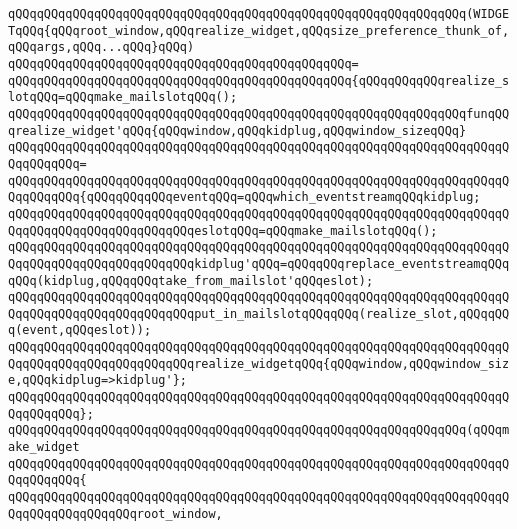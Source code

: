 \verb|qQQqqQQqqQQqqQQqqQQqqQQqqQQqqQQqqQQqqQQqqQQqqQQqqQQqqQQqqQQqqQQq(WIDGETqQQq{qQQqroot_window,qQQqrealize_widget,qQQqsize_preference_thunk_of,qQQqargs,qQQq...qQQq}qQQq)|\newline
\verb|qQQqqQQqqQQqqQQqqQQqqQQqqQQqqQQqqQQqqQQqqQQqqQQq=|\newline
\verb|qQQqqQQqqQQqqQQqqQQqqQQqqQQqqQQqqQQqqQQqqQQqqQQq{qQQqqQQqqQQqrealize_slotqQQq=qQQqmake_mailslotqQQq();|\newline
\newline
\verb|qQQqqQQqqQQqqQQqqQQqqQQqqQQqqQQqqQQqqQQqqQQqqQQqqQQqqQQqqQQqqQQqfunqQQqrealize_widget'qQQq{qQQqwindow,qQQqkidplug,qQQqwindow_sizeqQQq}|\newline
\verb|qQQqqQQqqQQqqQQqqQQqqQQqqQQqqQQqqQQqqQQqqQQqqQQqqQQqqQQqqQQqqQQqqQQqqQQqqQQqqQQq=|\newline
\verb|qQQqqQQqqQQqqQQqqQQqqQQqqQQqqQQqqQQqqQQqqQQqqQQqqQQqqQQqqQQqqQQqqQQqqQQqqQQqqQQq{qQQqqQQqqQQqeventqQQq=qQQqwhich_eventstreamqQQqkidplug;|\newline
\verb|qQQqqQQqqQQqqQQqqQQqqQQqqQQqqQQqqQQqqQQqqQQqqQQqqQQqqQQqqQQqqQQqqQQqqQQqqQQqqQQqqQQqqQQqqQQqqQQqeslotqQQq=qQQqmake_mailslotqQQq();|\newline
\newline
\verb|qQQqqQQqqQQqqQQqqQQqqQQqqQQqqQQqqQQqqQQqqQQqqQQqqQQqqQQqqQQqqQQqqQQqqQQqqQQqqQQqqQQqqQQqqQQqqQQqkidplug'qQQq=qQQqqQQqreplace_eventstreamqQQqqQQq(kidplug,qQQqqQQqtake_from_mailslot'qQQqeslot);|\newline
\newline
\verb|qQQqqQQqqQQqqQQqqQQqqQQqqQQqqQQqqQQqqQQqqQQqqQQqqQQqqQQqqQQqqQQqqQQqqQQqqQQqqQQqqQQqqQQqqQQqqQQqput_in_mailslotqQQqqQQq(realize_slot,qQQqqQQq(event,qQQqeslot));|\newline
\newline
\verb|qQQqqQQqqQQqqQQqqQQqqQQqqQQqqQQqqQQqqQQqqQQqqQQqqQQqqQQqqQQqqQQqqQQqqQQqqQQqqQQqqQQqqQQqqQQqqQQqrealize_widgetqQQq{qQQqwindow,qQQqwindow_size,qQQqkidplug=>kidplug'};|\newline
\verb|qQQqqQQqqQQqqQQqqQQqqQQqqQQqqQQqqQQqqQQqqQQqqQQqqQQqqQQqqQQqqQQqqQQqqQQqqQQqqQQq};|\newline
\newline
\verb|qQQqqQQqqQQqqQQqqQQqqQQqqQQqqQQqqQQqqQQqqQQqqQQqqQQqqQQqqQQqqQQq(qQQqmake_widget|\newline
\verb|qQQqqQQqqQQqqQQqqQQqqQQqqQQqqQQqqQQqqQQqqQQqqQQqqQQqqQQqqQQqqQQqqQQqqQQqqQQqqQQq{|\newline
\verb|qQQqqQQqqQQqqQQqqQQqqQQqqQQqqQQqqQQqqQQqqQQqqQQqqQQqqQQqqQQqqQQqqQQqqQQqqQQqqQQqqQQqqQQqroot_window,|\newline

